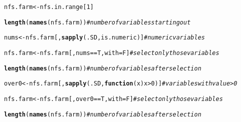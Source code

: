 \documentclass{article}\usepackage[]{graphicx}\usepackage[]{color}
\makeatletter
\newcommand{\hlcom}[1]{\textcolor[rgb]{0.678,0.584,0.686}{\textit{#1}}}%
\newcommand{\hlkwd}[1]{\textcolor[rgb]{0.737,0.353,0.396}{\textbf{#1}}}%
\newenvironment{kframe}{%
 \def\at@end@of@kframe{}%
 \ifinner\ifhmode%
  \def\at@end@of@kframe{\end{minipage}}%
  \begin{minipage}{\columnwidth}%
 \fi\fi%
 \def\FrameCommand##1{\hskip\@totalleftmargin \hskip-\fboxsep
 \colorbox{shadecolor}{##1}\hskip-\fboxsep
     \hskip-\linewidth \hskip-\@totalleftmargin \hskip\columnwidth}%
 \MakeFramed {\advance\hsize-\width
   \@totalleftmargin\z@ \linewidth\hsize
   \@setminipage}}%
 {\par\unskip\endMakeFramed%
 \at@end@of@kframe}
\newenvironment{knitrout}{}{} %
\makeatother
\begin{document}
\begin{flushleft}
\begin{knitrout}
\begin{kframe}
{\ttfamily\noindent\bfseries\color{errorcolor}{\#\# Error: object 'in.range' not found}}\begin{alltt}
nfs.farm <- nfs.in.range[1]
\end{alltt}


{\ttfamily\noindent\bfseries\color{errorcolor}{\#\# Error: object 'nfs.in.range' not found}}\begin{alltt}
\hlkwd{length}(\hlkwd{names}(nfs.farm))  \hlcom{# number of variables starting out}
\end{alltt}


{\ttfamily\noindent\bfseries\color{errorcolor}{\#\# Error: object 'nfs.farm' not found}}\begin{alltt}
nums <- nfs.farm[, \hlkwd{sapply}(.SD, is.numeric)]  \hlcom{# numeric variables}
\end{alltt}


{\ttfamily\noindent\bfseries\color{errorcolor}{\#\# Error: object 'nfs.farm' not found}}\begin{alltt}
nfs.farm <- nfs.farm[, nums == T, with = F]  \hlcom{# select only those variables}
\end{alltt}


{\ttfamily\noindent\bfseries\color{errorcolor}{\#\# Error: object 'nfs.farm' not found}}\begin{alltt}
\hlkwd{length}(\hlkwd{names}(nfs.farm))  \hlcom{# number of variables after selection}
\end{alltt}


{\ttfamily\noindent\bfseries\color{errorcolor}{\#\# Error: object 'nfs.farm' not found}}\begin{alltt}
over0 <- nfs.farm[, \hlkwd{sapply}(.SD, \hlkwd{function}(x) x > 0)]  \hlcom{# variables with value > 0}
\end{alltt}


{\ttfamily\noindent\bfseries\color{errorcolor}{\#\# Error: object 'nfs.farm' not found}}\begin{alltt}
nfs.farm <- nfs.farm[, over0 == T, with = F]  \hlcom{# select only those variables}
\end{alltt}


{\ttfamily\noindent\bfseries\color{errorcolor}{\#\# Error: object 'nfs.farm' not found}}\begin{alltt}
\hlkwd{length}(\hlkwd{names}(nfs.farm))  \hlcom{# number of variables after selection}
\end{alltt}


{\ttfamily\noindent\bfseries\color{errorcolor}{\#\# Error: object 'nfs.farm' not found}}\begin{alltt}


\end{alltt}
\end{kframe}
\end{knitrout}
\end{flushleft}
\end{document}
